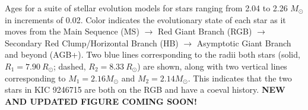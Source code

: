 \label{fig:mesa} Ages for a suite of stellar evolution models for stars ranging from 2.04 to 2.26 $M_{\odot}$ in increments of 0.02. Color indicates the evolutionary state of each star as it moves from the Main Sequence (MS) $\rightarrow$ Red Giant Branch (RGB) $\rightarrow$ Secondary Red Clump/Horizontal Branch (HB) $\rightarrow$ Asymptotic Giant Branch and beyond (AGB+). Two blue lines corresponding to the radii both stars (solid, $R_1 = 7.90 \ R_\odot$; dashed, $R_2 = 8.33 \ R_\odot$) are shown, along with two vertical lines corresponding to $M_1 = 2.16 M_\odot$ and $M_2 = 2.14 M_\odot$. This indicates that the two stars in KIC 9246715 are both on the RGB and have a coeval history. \textbf{NEW AND UPDATED FIGURE COMING SOON!}

  